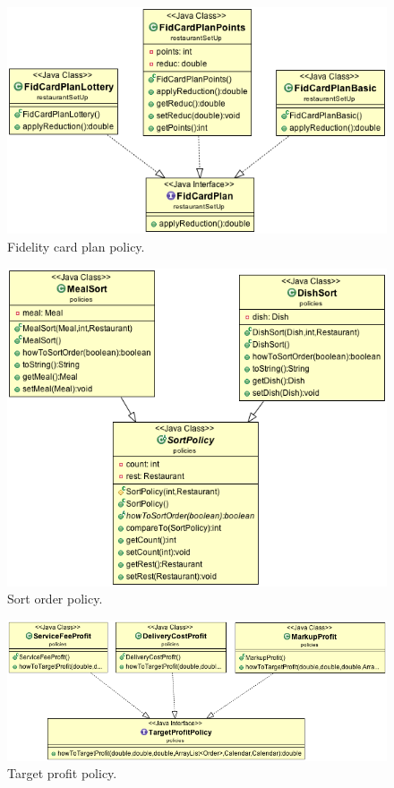 \begin{figure}
  \begin{center}
    \includegraphics[scale=0.5]{./img/FidCardPlan.png}
    \end{center}
  \caption{\umld Fidelity card plan policy.}
  \label{fig:fidcardplan_uml}
\end{figure}
\begin{figure}
  \begin{center}
    \includegraphics[scale=0.5]{./img/SortOrderPolicy.png}
    \end{center}
  \caption{\umld Sort order policy.}
  \label{fig:sortorder_uml}
\end{figure}
\begin{figure}
  \begin{center}
    \includegraphics[scale=0.5]{./img/TargetProfitPolicy.png}
    \end{center}
  \caption{\umld Target profit policy.}
  \label{fig:targetprofit_uml}
\end{figure}
